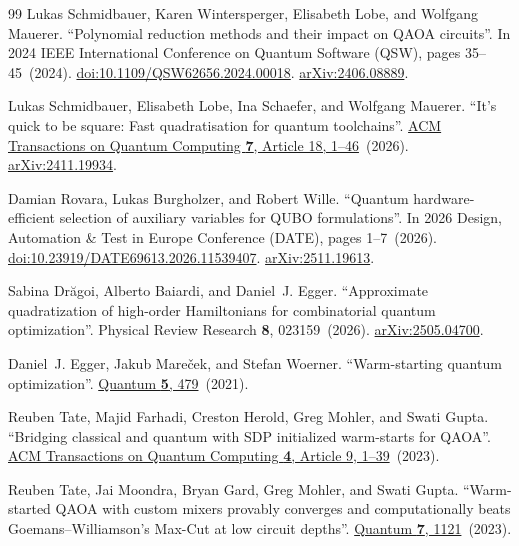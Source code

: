 \documentclass[a4paper,onecolumn,11pt,unpublished]{quantumarticle}
\theoremstyle{remark}
\begin{document}
\begin{thebibliography}{99}
Lukas Schmidbauer, Karen Wintersperger, Elisabeth Lobe, and Wolfgang Mauerer.
\newblock ``Polynomial reduction methods and their impact on QAOA circuits''.
\newblock In 2024 IEEE International Conference on Quantum Software (QSW), pages 35--45~(2024).
\newblock \href{https://dx.doi.org/10.1109/QSW62656.2024.00018}{doi:10.1109/QSW62656.2024.00018}.
\newblock \href{http://arxiv.org/abs/2406.08889}{arXiv:2406.08889}.

Lukas Schmidbauer, Elisabeth Lobe, Ina Schaefer, and Wolfgang Mauerer.
\newblock ``It's quick to be square: Fast quadratisation for quantum toolchains''.
\newblock \href{https://dx.doi.org/10.1145/3800943}{ACM Transactions on Quantum Computing {\bf 7}, Article 18, 1--46}~(2026).
\newblock \href{http://arxiv.org/abs/2411.19934}{arXiv:2411.19934}.

Damian Rovara, Lukas Burgholzer, and Robert Wille.
\newblock ``Quantum hardware-efficient selection of auxiliary variables for QUBO formulations''.
\newblock In 2026 Design, Automation \& Test in Europe Conference (DATE), pages 1--7~(2026).
\newblock \href{https://dx.doi.org/10.23919/DATE69613.2026.11539407}{doi:10.23919/DATE69613.2026.11539407}.
\newblock \href{http://arxiv.org/abs/2511.19613}{arXiv:2511.19613}.

Sabina Dr{\u a}goi, Alberto Baiardi, and Daniel~J. Egger.
\newblock ``Approximate quadratization of high-order Hamiltonians for combinatorial quantum optimization''.
\newblock Physical Review Research {\bf 8}, 023159~(2026).
\newblock \href{http://arxiv.org/abs/2505.04700}{arXiv:2505.04700}.

Daniel~J. Egger, Jakub Mare{\v c}ek, and Stefan Woerner.
\newblock ``Warm-starting quantum optimization''.
\newblock \href{https://dx.doi.org/10.22331/q-2021-06-17-479}{Quantum {\bf 5}, 479}~(2021).

Reuben Tate, Majid Farhadi, Creston Herold, Greg Mohler, and Swati Gupta.
\newblock ``Bridging classical and quantum with SDP initialized warm-starts for QAOA''.
\newblock \href{https://dx.doi.org/10.1145/3549554}{ACM Transactions on Quantum Computing {\bf 4}, Article 9, 1--39}~(2023).

Reuben Tate, Jai Moondra, Bryan Gard, Greg Mohler, and Swati Gupta.
\newblock ``Warm-started QAOA with custom mixers provably converges and computationally beats Goemans--Williamson's Max-Cut at low circuit depths''.
\newblock \href{https://dx.doi.org/10.22331/q-2023-09-26-1121}{Quantum {\bf 7}, 1121}~(2023).


\end{thebibliography}
\end{document}
